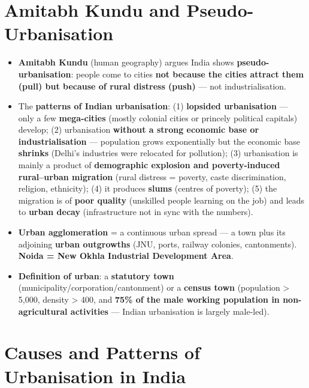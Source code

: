 \section{Amitabh Kundu and Pseudo-Urbanisation}

\begin{KeyConcept}
\begin{itemize}
\item \textbf{Amitabh Kundu} (human geography) argues India shows \textbf{pseudo-urbanisation}: people come to cities \textbf{not because the cities attract them (pull) but because of rural distress (push)} --- not industrialisation.
\item The \textbf{patterns of Indian urbanisation}: (1) \textbf{lopsided urbanisation} --- only a few \textbf{mega-cities} (mostly colonial cities or princely political capitals) develop; (2) urbanisation \textbf{without a strong economic base or industrialisation} --- population grows exponentially but the economic base \textbf{shrinks} (Delhi's industries were relocated for pollution); (3) urbanisation is mainly a product of \textbf{demographic explosion and poverty-induced rural--urban migration} (rural distress = poverty, caste discrimination, religion, ethnicity); (4) it produces \textbf{slums} (centres of poverty); (5) the migration is of \textbf{poor quality} (unskilled people learning on the job) and leads to \textbf{urban decay} (infrastructure not in sync with the numbers).
\item \textbf{Urban agglomeration} = a continuous urban spread --- a town plus its adjoining \textbf{urban outgrowths} (JNU, ports, railway colonies, cantonments). \textbf{Noida = New Okhla Industrial Development Area}.
\item \textbf{Definition of urban}: a \textbf{statutory town} (municipality/corporation/cantonment) or a \textbf{census town} (population > 5,000, density > 400, and \textbf{75\% of the male working population in non-agricultural activities} --- Indian urbanisation is largely male-led).
\end{itemize}
\end{KeyConcept}

\section{Causes and Patterns of Urbanisation in India}


